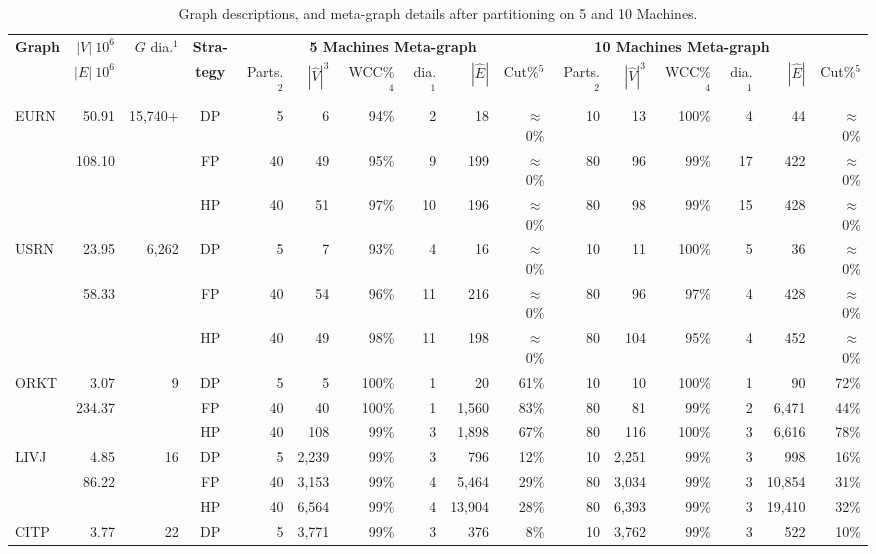 \documentclass[10pt,conference, compsocconf]{IEEEtran}
\begin{document}
\begin{table*}[t]
\centering
\scriptsize
\caption{Graph descriptions, and meta-graph details after partitioning on 5 and 10 Machines.} 
\begin{tabular}{p{.8cm}|r|r||c||r|r|r|r|r|r||r|r|r|r|r|r}
\hline
{\textbf{Graph}} & $|V|~10^6$ & ${G}$ dia.$^1$ & \textbf{{Stra-}}& \multicolumn{6}{c||}{\textbf{5 Machines Meta-graph}} & \multicolumn{5}{c}{\textbf{10 Machines Meta-graph}}\\
\cline{5-16}
& $|E|~10^6$ & & \textbf{{tegy}} & Parts.$^2$ & $|\widehat{V}|^3$ &WCC\%$^4$& dia.$^1$&$|\widehat{E}|$ &Cut\%$^5$& Parts.$^2$ & $|\widehat{V}|^3$ &WCC\%$^4$& dia.$^1$&$|\widehat{E}|$ &Cut\%$^5$ \\
\hline
\hline
EURN & 50.91 & 15,740+ & DP &   5&  6&94\%& 2& 18&$\approx$ 0\%&  10& 13 & 100\%& 4& 44&$\approx$  0\%\\
     & 108.10        & & FP &  40& 49&95\%& 9& 199&$\approx$ 0\%&  80& 96& 99\%& 17&  422&$\approx$  0\%\\
                    && & HP &  40& 51&97\%&10& 196&$\approx$ 0\%&  80& 98& 99\%& 15&  428&$\approx$  0\%\\
\hline
USRN & 23.95 & 6,262 & DP &   5&  7& 93\%&  4& 16&$\approx$  0\%&  10& 11 & 100\%& 5& 36&  $\approx$  0\%\\
           & 58.33 & & FP &  40& 54& 96\%& 11& 216&$\approx$  0\%&  80& 96& 97\%& 4&  428&$\approx$  0\%\\
                  && & HP &  40& 49& 98\%& 11& 198&$\approx$  0\%&  80& 104& 95\%& 4& 452&$\approx$  0\%\\
\hline
\hline
ORKT & 3.07   & 9 & DP &   5&   5 & 100\% & 1& 20& 61\%&  10&  10 & 100\% & 1& 90& 72\%\\
     & 234.37 &   & FP &  40&  40 & 100\% & 1& 1,560& 83\%&  80&  81 & 99\% & 2& 6,471& 44\%\\
&&                & HP &  40& 108 &  99\% & 3& 1,898& 67\%&  80& 116 &  100\% & 3& 6,616&  78\%\\
\hline
LIVJ & 4.85 & 16 & DP &   5& 2,239& 99\%& 3& 796& 12\%&  10 & 2,251& 99\%& 3& 998& 16\%\\
       & 86.22 & & FP &  40& 3,153& 99\%& 4&  5,464& 29\%&  80 & 3,034& 99\%& 3& 10,854& 31\% \\
               &&& HP &  40& 6,564& 99\%& 4&  13,904& 28\%&  80 & 6,393& 99\%& 3& 19,410& 32\% \\
\hline 
CITP & 3.77 & 22 & DP &  5& 3,771& 99\%& 3& 376& 8\%&  10& 3,762& 99\%& 3& 522& 10\%\\

\end{tabular}
\end{table*}
\end{document}

